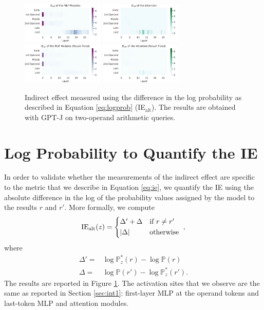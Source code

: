 \documentclass[11pt]{article}
\begin{document}
\begin{figure}[ht]
    \centering
    \includegraphics[width=0.35\textwidth]{img/j/j-mlp-logprob.pdf}
    \includegraphics[width=0.35\textwidth]{img/j/j-attn-logprob.pdf}
    \includegraphics[width=0.35\textwidth]{img/j/j-mlp-int2-logprob.pdf}
    \includegraphics[width=0.35\textwidth]{img/j/j-attn-int2-logprob.pdf}
    \caption{Indirect effect measured using the difference in the log probability as described in Equation \ref{eq:logprob} (IE$_\mathrm{alt}$). The results are obtained with GPT-J on two-operand arithmetic queries.}
    \label{fig:logprob}
\end{figure}



\section{Log Probability to Quantify the IE}
\label{sec:logprob}
In order to validate whether the measurements of the indirect effect are specific to the metric that we describe in Equation \ref{eq:ie}, we quantify the IE using the absolute difference in the log of the probability values assigned by the model to the results $r$ and $r'$. More formally, we compute
\begin{align}
\label{eq:logprob}
    \mathrm{IE}_{\mathrm{alt}}(z) =
     \begin{cases*}
       \Delta' + \Delta  & if $r \neq r'$ \\
      | \Delta |      & otherwise
    \end{cases*}, 
\end{align}
where
\begin{align}
    \Delta' = & \log \mathbb{P}_z^*(r) - \log \mathbb{P}(r) \\
    \Delta =  & \log \mathbb{P}(r') - \log \mathbb{P}_z^*(r') .
\end{align}
The results are reported in Figure \ref{fig:logprob}. The activation sites that we observe are the same as reported in Section \ref{sec:int1}: first-layer MLP at the operand tokens and last-token MLP and attention modules. 
\end{document}
